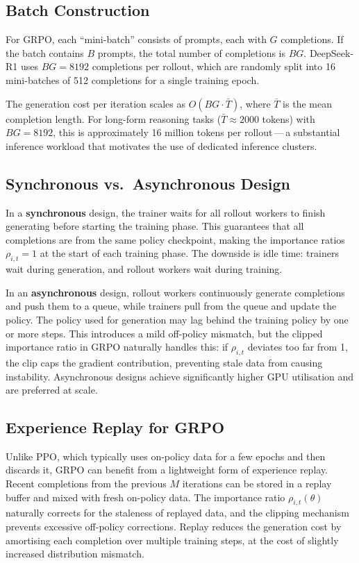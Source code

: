 \subsection{Batch Construction}

For GRPO, each ``mini-batch'' consists of prompts, each with $G$ completions.  If the batch contains $B$ prompts, the total number of completions is $BG$.  DeepSeek-R1 uses $BG = 8192$ completions per rollout, which are randomly split into 16 mini-batches of 512 completions for a single training epoch.

The generation cost per iteration scales as $O(BG \cdot \bar{T})$, where $\bar{T}$ is the mean completion length.  For long-form reasoning tasks ($\bar{T} \approx 2000$ tokens) with $BG = 8192$, this is approximately 16 million tokens per rollout\,---\,a substantial inference workload that motivates the use of dedicated inference clusters.

\subsection{Synchronous vs.\ Asynchronous Design}

In a \textbf{synchronous} design, the trainer waits for all rollout workers to finish generating before starting the training phase.  This guarantees that all completions are from the same policy checkpoint, making the importance ratios $\rho_{i,t} = 1$ at the start of each training phase.  The downside is idle time: trainers wait during generation, and rollout workers wait during training.

In an \textbf{asynchronous} design, rollout workers continuously generate completions and push them to a queue, while trainers pull from the queue and update the policy.  The policy used for generation may lag behind the training policy by one or more steps.  This introduces a mild off-policy mismatch, but the clipped importance ratio in GRPO naturally handles this: if $\rho_{i,t}$ deviates too far from 1, the clip caps the gradient contribution, preventing stale data from causing instability.  Asynchronous designs achieve significantly higher GPU utilisation and are preferred at scale.

\subsection{Experience Replay for GRPO}

Unlike PPO, which typically uses on-policy data for a few epochs and then discards it, GRPO can benefit from a lightweight form of experience replay.  Recent completions from the previous $M$ iterations can be stored in a replay buffer and mixed with fresh on-policy data.  The importance ratio $\rho_{i,t}(\theta)$ naturally corrects for the staleness of replayed data, and the clipping mechanism prevents excessive off-policy corrections.  Replay reduces the generation cost by amortising each completion over multiple training steps, at the cost of slightly increased distribution mismatch.

